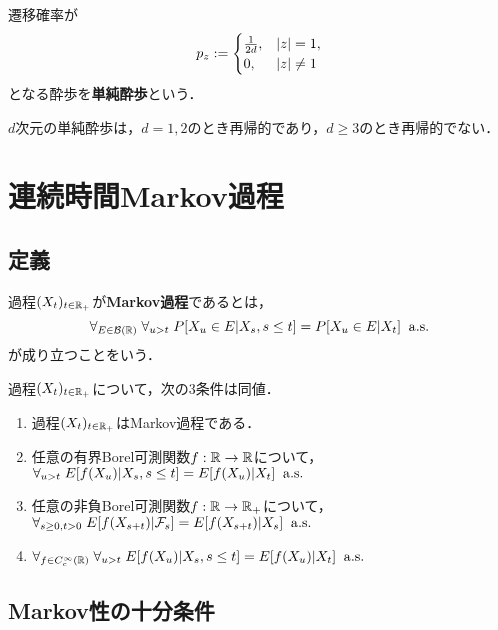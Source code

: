 \documentclass[uplatex,dvipdfmx]{jsreport}
\begin{document}
\begin{definition}
    遷移確率が
    \[p_z:=\begin{cases}
        \frac{1}{2d},&\lvert z\rvert=1,\\
        0,&\lvert z\rvert\ne1
    \end{cases}\]
    となる酔歩を\textbf{単純酔歩}という．
\end{definition}

\begin{theorem}[Polya]
    $d$次元の単純酔歩は，$d=1,2$のとき再帰的であり，$d\ge3$のとき再帰的でない．
\end{theorem}



\section{連続時間Markov過程}

\subsection{定義}

\begin{definition}
    過程$(X_t)_{t\in\mathbb{R}_+}$が\textbf{Markov過程}であるとは，
    \[\forall_{E\in\mathcal{B}(\mathbb{R})}\;\forall_{u>t}\;P[X_u\in E|X_s,s\le t]=P[X_u\in E|X_t]\;\;\mathrm{a.s.}\]
    が成り立つことをいう．
\end{definition}

\begin{lemma}[Markov性の特徴付け]
    過程$(X_t)_{t\in\mathbb{R}_+}$について，次の3条件は同値．
    \begin{enumerate}
        \item 過程$(X_t)_{t\in\mathbb{R}_+}$はMarkov過程である．
        \item 任意の有界Borel可測関数$f:\mathbb{R}\to\mathbb{R}$について，$\forall_{u>t}\;E[f(X_u)|X_s,s\le t]=E[f(X_u)|X_t]\;\;\mathrm{a.s.}$
        \item 任意の非負Borel可測関数$f:\mathbb{R}\to\mathbb{R}_+$について，$\forall_{s\ge0,t>0}\;E[f(X_{s+t})|\mathcal{F}_s]=E[f(X_{s+t})|X_s]\;\;\mathrm{a.s.}$
        \item $\forall_{f\in C_c^\infty(\mathbb{R})}\;\forall_{u>t}\;E[f(X_u)|X_s,s\le t]=E[f(X_u)|X_t]\;\;\mathrm{a.s.}$
    \end{enumerate}
\end{lemma}

\subsection{Markov性の十分条件}
\end{document}
